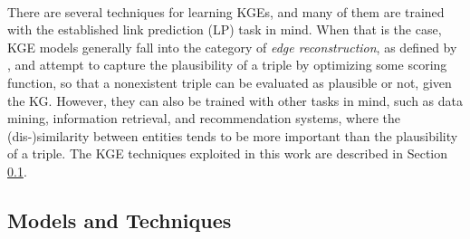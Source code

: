 \documentclass[11pt,titlepage,oneside,openany]{book}
\begin{document}
\\
There are several techniques for learning KGEs, and many of them are trained with the established link prediction (LP) task in mind. When that is the case, KGE models generally fall into the category of \textit{edge reconstruction}, as defined by \cite{cai_comprehensive_2018}, and attempt to capture the plausibility of a triple by optimizing some scoring function, so that a nonexistent triple can be evaluated as plausible or not, given the KG. However, they can also be trained with other tasks in mind, such as data mining, information retrieval, and recommendation systems, where the (dis-)similarity between entities tends to be more important than the plausibility of a triple. The KGE techniques exploited in this work are described in Section \ref{subsec:models-tech}.


\subsection{Models and Techniques}
\label{subsec:models-tech}
\end{document}
